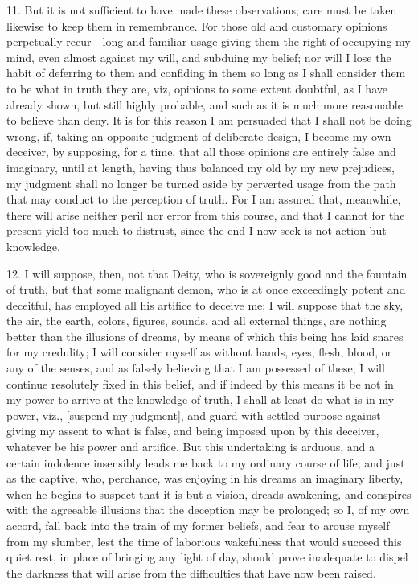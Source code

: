 11. But it is not sufficient to have made these observations; care must be taken likewise to keep them in remembrance. For those old and customary opinions perpetually recur—long and familiar usage giving them the right of occupying my mind, even almost against my will, and subduing my belief; nor will I lose the habit of deferring to them and confiding in them so long as I shall consider them to be what in truth they are, viz, opinions to some extent doubtful, as I have already shown, but still highly probable, and such as it is much more reasonable to believe than deny. It is for this reason I am persuaded that I shall not be doing wrong, if, taking an opposite judgment of deliberate design, I become my own deceiver, by supposing, for a time, that all those opinions are entirely false and imaginary, until at length, having thus balanced my old by my new prejudices, my judgment shall no longer be turned aside by perverted usage from the path that may conduct to the perception of truth. For I am assured that, meanwhile, there will arise neither peril nor error from this course, and that I cannot for the present yield too much to distrust, since the end I now seek is not action but knowledge.

12. I will suppose, then, not that Deity, who is sovereignly good and the fountain of truth, but that some malignant demon, who is at once exceedingly potent and deceitful, has employed all his artifice to deceive me; I will suppose that the sky, the air, the earth, colors, figures, sounds, and all external things, are nothing better than the illusions of dreams, by means of which this being has laid snares for my credulity; I will consider myself as without hands, eyes, flesh, blood, or any of the senses, and as falsely believing that I am possessed of these; I will continue resolutely fixed in this belief, and if indeed by this means it be not in my power to arrive at the knowledge of truth, I shall at least do what is in my power, viz., [suspend my judgment], and guard with settled purpose against giving my assent to what is false, and being imposed upon by this deceiver, whatever be his power and artifice. But this undertaking is arduous, and a certain indolence insensibly leads me back to my ordinary course of life; and just as the captive, who, perchance, was enjoying in his dreams an imaginary liberty, when he begins to suspect that it is but a vision, dreads awakening, and conspires with the agreeable illusions that the deception may be prolonged; so I, of my own accord, fall back into the train of my former beliefs, and fear to arouse myself from my slumber, lest the time of laborious wakefulness that would succeed this quiet rest, in place of bringing any light of day, should prove inadequate to dispel the darkness that will arise from the difficulties that have now been raised.

